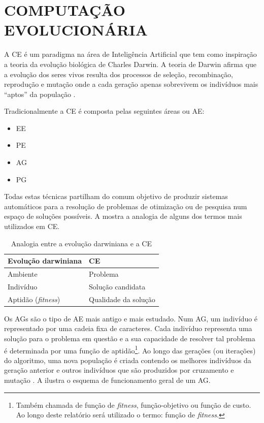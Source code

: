 \section{COMPUTAÇÃO EVOLUCIONÁRIA}
\label{sec:computacaoevolucionaria}

A \ac{CE} é um paradigma na área de Inteligência Artificial 
que tem como inspiração a teoria da evolução biológica de Charles Darwin. A teoria de Darwin afirma que a evolução 
dos seres vivos resulta dos processos de seleção, recombinação, reprodução e mutação onde a cada geração apenas sobrevivem os 
indivíduos mais “aptos” da população \citep{Darwin1859}. 

Tradicionalmente a \ac{CE} é composta pelas seguintes áreas ou \ac{AE}:
\begin{itemize}
  	\item {\ac{EE} \citep{Schw75}}
  	\item {\ac{PE} \citep{Fogel1962}} 
	\item {\ac{AG} \citep{Holland1975}}
	\item {\ac{PG} \citep{Koza1992}}
\end{itemize}

Todas estas técnicas partilham do comum objetivo de produzir sistemas automáticos para a resolução de problemas de otimização ou de pesquisa num 
espaço de soluções possíveis. A  mostra a analogia de alguns dos termos mais utilizados em \ac{CE}.

\begin{table}[H]
    \begin{tabular}{ll}%
    \toprule
    \textbf{Evolução darwiniana} & \textbf{\ac{CE}}\\ 
    \midrule
    Ambiente				& Problema\\ 
    Indivíduo				& Solução candidata\\ 
    Aptidão	(\emph{fitness})	& Qualidade da solução\\
    \bottomrule
    \end{tabular}
    \centering
    \caption{Analogia entre a evolução darwiniana e a \ac{CE}}
    \label{Tabela111}
\end{table}

Os \acp{AG} são o tipo de \ac{AE} mais antigo e mais estudado. Num \ac{AG}, um indivíduo 
é representado por uma cadeia fixa de caracteres. Cada indivíduo representa uma solução para o problema em questão e a sua 
capacidade de resolver tal problema é determinada por uma 
função de aptidão\footnote{Também chamada de função de \emph{fitness}, função-objetivo ou função de custo. Ao longo deste relatório 
será utilizado o termo: função de \emph{fitness}.}.
Ao longo das gerações (ou iterações) do algoritmo, uma nova população é criada contendo os melhores indivíduos da 
geração anterior e outros indivíduos que são produzidos por cruzamento e mutação \citep{mitchell1998introduction}. 
A  ilustra o esquema de funcionamento geral de um \ac{AG}.

